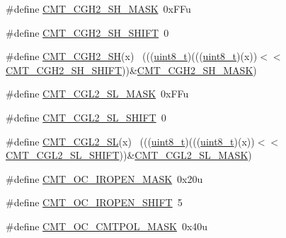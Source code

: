 \begin{DoxyCompactItemize}
\item 
\#define \hyperlink{group___c_m_t___register___masks_ga8637e794f015ee608b47a547e35a72ea}{C\+M\+T\+\_\+\+C\+G\+H2\+\_\+\+S\+H\+\_\+\+M\+A\+SK}~0x\+F\+Fu
\item 
\#define \hyperlink{group___c_m_t___register___masks_gafcef3256a8434ecb052c1e6fa0226459}{C\+M\+T\+\_\+\+C\+G\+H2\+\_\+\+S\+H\+\_\+\+S\+H\+I\+FT}~0
\item 
\#define \hyperlink{group___c_m_t___register___masks_gaa3a74404a2679da47172d09576a8ba2b}{C\+M\+T\+\_\+\+C\+G\+H2\+\_\+\+SH}(x)                                                  ~(((\hyperlink{_p_e___types_8h_aba7bc1797add20fe3efdf37ced1182c5}{uint8\+\_\+t})(((\hyperlink{_p_e___types_8h_aba7bc1797add20fe3efdf37ced1182c5}{uint8\+\_\+t})(x))$<$$<$\hyperlink{group___c_m_t___register___masks_gafcef3256a8434ecb052c1e6fa0226459}{C\+M\+T\+\_\+\+C\+G\+H2\+\_\+\+S\+H\+\_\+\+S\+H\+I\+FT}))\&\hyperlink{group___c_m_t___register___masks_ga8637e794f015ee608b47a547e35a72ea}{C\+M\+T\+\_\+\+C\+G\+H2\+\_\+\+S\+H\+\_\+\+M\+A\+SK})
\item 
\#define \hyperlink{group___c_m_t___register___masks_gafd7f251bad02bcf7549874db413adcf9}{C\+M\+T\+\_\+\+C\+G\+L2\+\_\+\+S\+L\+\_\+\+M\+A\+SK}~0x\+F\+Fu
\item 
\#define \hyperlink{group___c_m_t___register___masks_ga5a5d53932d1fcce0a0f2e9fc29400df8}{C\+M\+T\+\_\+\+C\+G\+L2\+\_\+\+S\+L\+\_\+\+S\+H\+I\+FT}~0
\item 
\#define \hyperlink{group___c_m_t___register___masks_ga7875c0e5f5a2eeb12ed641f1fa64ba19}{C\+M\+T\+\_\+\+C\+G\+L2\+\_\+\+SL}(x)                                                  ~(((\hyperlink{_p_e___types_8h_aba7bc1797add20fe3efdf37ced1182c5}{uint8\+\_\+t})(((\hyperlink{_p_e___types_8h_aba7bc1797add20fe3efdf37ced1182c5}{uint8\+\_\+t})(x))$<$$<$\hyperlink{group___c_m_t___register___masks_ga5a5d53932d1fcce0a0f2e9fc29400df8}{C\+M\+T\+\_\+\+C\+G\+L2\+\_\+\+S\+L\+\_\+\+S\+H\+I\+FT}))\&\hyperlink{group___c_m_t___register___masks_gafd7f251bad02bcf7549874db413adcf9}{C\+M\+T\+\_\+\+C\+G\+L2\+\_\+\+S\+L\+\_\+\+M\+A\+SK})
\item 
\#define \hyperlink{group___c_m_t___register___masks_ga7f61dcc57756388d9e913eb3653c2e58}{C\+M\+T\+\_\+\+O\+C\+\_\+\+I\+R\+O\+P\+E\+N\+\_\+\+M\+A\+SK}~0x20u
\item 
\#define \hyperlink{group___c_m_t___register___masks_ga0d1d56279862ab5f549e82bd9c25b0f2}{C\+M\+T\+\_\+\+O\+C\+\_\+\+I\+R\+O\+P\+E\+N\+\_\+\+S\+H\+I\+FT}~5
\item 
\#define \hyperlink{group___c_m_t___register___masks_ga8096ee7b689f4a27e80c6d13f4097587}{C\+M\+T\+\_\+\+O\+C\+\_\+\+C\+M\+T\+P\+O\+L\+\_\+\+M\+A\+SK}~0x40u

\end{DoxyCompactItemize}
